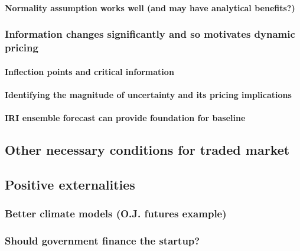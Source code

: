 \documentclass[authoryear]{article}
\begin{document}
\paragraph{Normality assumption works well (and may have analytical benefits?)}

\subsubsection{Information changes significantly and so motivates dynamic pricing}

\paragraph{Inflection points and critical information}

\paragraph{Identifying the magnitude of uncertainty and its pricing implications}

\paragraph{IRI ensemble forecast can provide foundation for baseline}

\subsection{Other necessary conditions for traded market}

\subsection{Positive externalities}

\subsubsection{Better climate models (O.J. futures example)}

\subsubsection{Should government finance the startup?}



\end{document}
